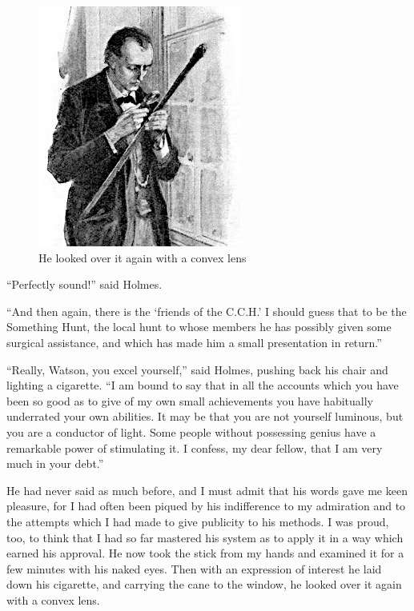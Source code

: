 \documentclass[paper=5.5in:8.5in,BCOR=7mm,twoside,DIV=calc,12pt,usegeometry,openany,chapterprefix,endperiod,headings=big]{scrbook} %
\begin{document}
\begin{figure}[tbhp]
\centering
\includegraphics[width=0.6\linewidth]{01_convexlensdetail}
\caption{He looked over it again with a convex lens}
\end{figure}

\enquote{Perfectly sound!} said Holmes.

\enquote{And then again, there is the \enquote{friends of the C.C.H.} I should guess that to be the Something Hunt, the local hunt to whose members he has possibly given some surgical assistance, and which has made him a small presentation in return.}

\enquote{Really, Watson, you excel yourself,} said Holmes, pushing back his chair and lighting a cigarette. \enquote{I am bound to say that in all the accounts which you have been so good as to give of my own small achievements you have habitually underrated your own abilities. It may be that you are not yourself luminous, but you are a conductor of light. Some people without possessing genius have a remarkable power of stimulating it. I confess, my dear fellow, that I am very much in your debt.}

He had never said as much before, and I must admit that his words gave me keen pleasure, for I had often been piqued by his indifference to my admiration and to the attempts which I had made to give publicity to his methods. I was proud, too, to think that I had so far mastered his system as to apply it in a way which earned his approval. He now took the stick from my hands and examined it for a few minutes with his naked eyes. Then with an expression of interest he laid down his cigarette, and carrying the cane to the window, he looked over it again with a convex lens.
\end{document}
